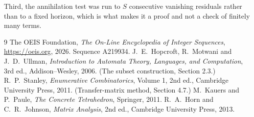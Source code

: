 \documentclass[11pt,a4paper]{article}
\theoremstyle{plain}
\theoremstyle{definition}
\begin{document}
Third, the annihilation test was run to $S$ consecutive vanishing residuals rather than to a
fixed horizon, which is what makes it a proof and not a check of finitely many terms.

\begin{thebibliography}{9}
 The OEIS Foundation, \emph{The On-Line Encyclopedia of Integer
Sequences}, \url{https://oeis.org}, 2026. Sequence A219934.
 J.~E.~Hopcroft, R.~Motwani and J.~D.~Ullman, \emph{Introduction to Automata
Theory, Languages, and Computation}, 3rd ed., Addison--Wesley, 2006. (The subset
construction, Section 2.3.)
 R.~P.~Stanley, \emph{Enumerative Combinatorics}, Volume 1, 2nd ed.,
Cambridge University Press, 2011. (Transfer-matrix method, Section 4.7.)
 M.~Kauers and P.~Paule, \emph{The Concrete Tetrahedron}, Springer, 2011.
 R.~A.~Horn and C.~R.~Johnson, \emph{Matrix Analysis}, 2nd ed., Cambridge
University Press, 2013.
\end{thebibliography}
\end{document}

